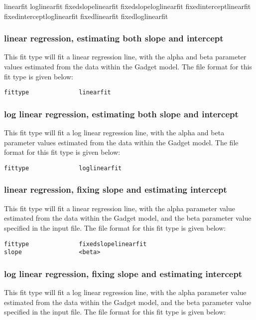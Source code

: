 \documentclass[10pt,twoside]{book}
\begin{document}
\bigskip
linearfit\newline
loglinearfit\newline
fixedslopelinearfit\newline
fixedslopeloglinearfit\newline
fixedinterceptlinearfit\newline
fixedinterceptloglinearfit\newline
fixedlinearfit\newline
fixedloglinearfit

\subsubsection{linear regression, estimating both slope and intercept}
This fit type will fit a linear regression line, with the alpha and beta parameter values estimated from the data within the Gadget model.  The file format for this fit type is given below:
{\small\begin{verbatim}
fittype              linearfit
\end{verbatim}}

\subsubsection{log linear regression, estimating both slope and intercept}
This fit type will fit a log linear regression line, with the alpha and beta parameter values estimated from the data within the Gadget model.  The file format for this fit type is given below:

{\small\begin{verbatim}
fittype              loglinearfit
\end{verbatim}}

\subsubsection{linear regression, fixing slope and estimating intercept}
This fit type will fit a linear regression line, with the alpha parameter value estimated from the data within the Gadget model, and the beta parameter value specified in the input file.  The file format for this fit type is given below:

{\small\begin{verbatim}
fittype              fixedslopelinearfit
slope                <beta>
\end{verbatim}}

\subsubsection{log linear regression, fixing slope and estimating intercept}
This fit type will fit a log linear regression line, with the alpha parameter value estimated from the data within the Gadget model, and the beta parameter value specified in the input file.  The file format for this fit type is given below:
\end{document}
